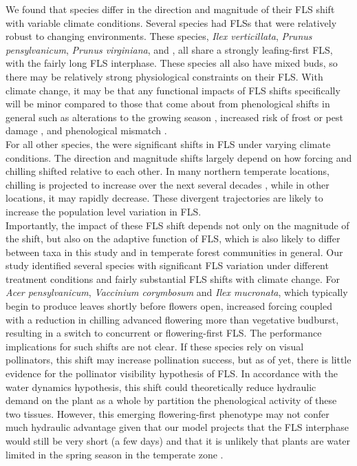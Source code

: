 \documentclass[11pt]{article}
\begin{document}
\noindent We found that species differ in the direction and magnitude of their FLS shift with variable climate conditions. Several species had FLSs that were relatively robust to changing environments. These species, \textit{Ilex verticillata}, \textit{Prunus pensylvanicum}, \textit{Prunus virginiana}, and , all share a strongly leafing-first FLS, with the  fairly long FLS interphase. These species all also have mixed buds, so there may be relatively strong physiological constraints on their FLS. With climate change, it may be that any functional impacts of FLS shifts specifically will be minor compared to those that come about from phenological shifts in general such as alterations to the growing season \citep{}, increased risk of frost or pest damage \citep{}, and phenological mismatch \citep{}. \\

For all other species, the were significant shifts in FLS under varying climate conditions. The direction and magnitude shifts largely depend on how forcing and chilling shifted relative to each other. In many northern temperate locations, chilling is projected to increase over the next several decades \citep{Ettinger}, while in other locations, it may rapidly decrease. These divergent trajectories are likely to increase the population level variation in FLS.\\

\noindent Importantly, the impact of these FLS shift depends not only on the magnitude of the shift, but also on the adaptive function of FLS, which is also likely to differ between taxa in this study and in temperate forest communities in general. Our study identified several species with significant FLS variation under different treatment conditions and fairly substantial FLS shifts with climate change. For \textit{Acer pensylvanicum}, \textit{Vaccinium corymbosum} and \textit{Ilex mucronata}, which typically begin to produce leaves shortly before flowers open, increased forcing coupled with a reduction in chilling advanced flowering more than vegetative budburst, resulting in a switch to concurrent or flowering-first FLS. The performance implications for such shifts are not clear. If these species rely on visual pollinators, this shift may increase pollination success, but as of yet, there is little evidence for the pollinator visibility hypothesis of FLS. In accordance with the water dynamics hypothesis, this shift could theoretically reduce hydraulic demand on the plant as a whole by partition the phenological activity of these two tissues. However, this emerging flowering-first phenotype may not confer much hydraulic advantage given that our model projects that the FLS interphase would still be very short (a few days) and that it is unlikely that plants are water limited in the spring season in the temperate zone \citep{Polgar2011}.\\
\end{document}
